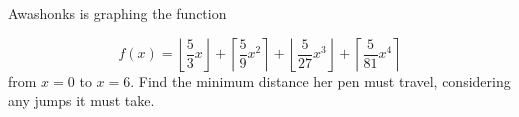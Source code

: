 Awashonks is graphing the function

$$f(x)=\left\lfloor\dfrac{5}{3}x\right\rfloor+\left\lceil\dfrac{5}{9}x^2\right\rceil+\left\lfloor\dfrac{5}{27}x^3\right\rfloor+\left\lceil\dfrac{5}{81}x^4\right\rceil$$from $x=0$ to $x=6$. Find the minimum distance her pen must travel, considering any jumps it must take.
